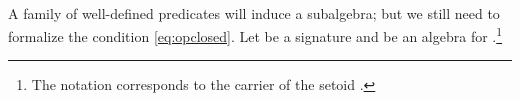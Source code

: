 \begin{code}
\>[0]\AgdaSpace{}%
\AgdaSymbol{:}\AgdaSpace{}%
\AgdaSymbol{(}\AgdaSpace{}%
\AgdaSymbol{:}\AgdaSpace{}%
\AgdaSymbol{)}\AgdaSpace{}%
\AgdaSpace{}%
\AgdaSymbol{(}
\AgdaSpace{}\AgdaSymbol{:}
\AgdaSpace{}\AgdaSpace{}%
\AgdaSpace{}\AgdaSpace{}
\AgdaSpace{}
\AgdaSymbol{)}
\AgdaSpace{}%
\<%
\\
\>[0]\AgdaSpace{}%
\AgdaSpace{}%
\AgdaSpace{}%
\AgdaSymbol{=}\AgdaSpace{}%
\AgdaSpace{}%
\AgdaSymbol{\{}
\AgdaSpace{}%
\AgdaSpace{}%
\AgdaSpace{}%
\AgdaSymbol{\}}\AgdaSpace{}%
\AgdaSpace{}%
\AgdaSpace{}%
\AgdaSpace{}%
\AgdaSpace{}%
\AgdaSpace{}%
\AgdaSpace{}%
\AgdaSpace{}%
\AgdaSpace{}%
\<%
\end{code}

\noindent A family of well-defined predicates will induce a
subalgebra; but we still need to formalize the condition
\eqref{eq:opclosed}.  Let  be a signature and
 be an algebra for .\footnote{The notation
  \AgdaSpace{}%
  \AgdaSpace{}\AgdaSpace{}
  corresponds to the carrier of the setoid \AgdaSpace{}%
  \AgdaSpace{}\AgdaSpace{}.}

